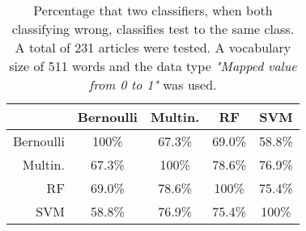\begin{table}[h]\footnotesize
	\caption{Percentage that two classifiers, when both classifying wrong, classifies test to the same class. A total of 231 articles were tested. A vocabulary size of 511 words and the data type \emph{"Mapped value from 0 to 1"} was used.}
	\begin{tabular}{r|cccc}
	\ 		 	& Bernoulli & Multin. 	&RF 		&SVM \\ \hline
	Bernoulli 	&100\%   	&67.3\%   	&69.0\%   	&58.8\%\\
	Multin. 	&67.3\%  	&100\%   	&78.6\%   	&76.9\%\\
	RF 			&69.0\%   	&78.6\%  	&100\%   	&75.4\%\\
	SVM 		&58.8\%   	&76.9\%   	&75.4\%  	&100\%
	\end{tabular}
	\label{tab:similarity}
\end{table}